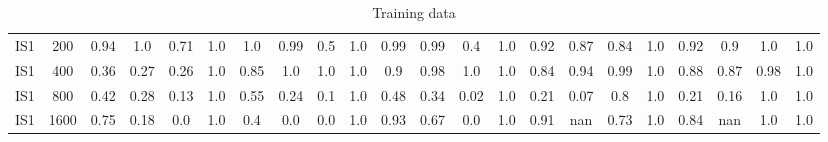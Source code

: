 \documentclass[10pt]{article}
\begin{document}
\begin{table}
\begin{tabular}{ cc||c c c c | c c c c | c c c c | c c c c| c c c c}
 					IS1 & 200 & 0.94 & 1.0 & 0.71 & 1.0 & 1.0 & 0.99 & 0.5 & 1.0& 0.99 & 0.99 & 0.4 & 1.0& 0.92 & 0.87 & 0.84 & 1.0 & 0.92 & 0.9 & 1.0 & 1.0\\ 
 					IS1 & 400 & 0.36 & 0.27 & 0.26 & 1.0 & 0.85 & 1.0 & 1.0 & 1.0& 0.9 & 0.98 & 1.0 & 1.0& 0.84 & 0.94 & 0.99 & 1.0 & 0.88 & 0.87 & 0.98 & 1.0\\ 
 					IS1 & 800 & 0.42 & 0.28 & 0.13 & 1.0 & 0.55 & 0.24 & 0.1 & 1.0& 0.48 & 0.34 & 0.02 & 1.0& 0.21 & 0.07 & 0.8 & 1.0 & 0.21 & 0.16 & 1.0 & 1.0\\ 
 					IS1 & 1600 & 0.75 & 0.18 & 0.0 & 1.0 & 0.4 & 0.0 & 0.0 & 1.0& 0.93 & 0.67 & 0.0 & 1.0& 0.91 & nan & 0.73 & 1.0 & 0.84 & nan & 1.0 & 1.0\\ \hline
 \hline
  \end{tabular}
  \caption{Training data}
\end{table}
\end{document}
